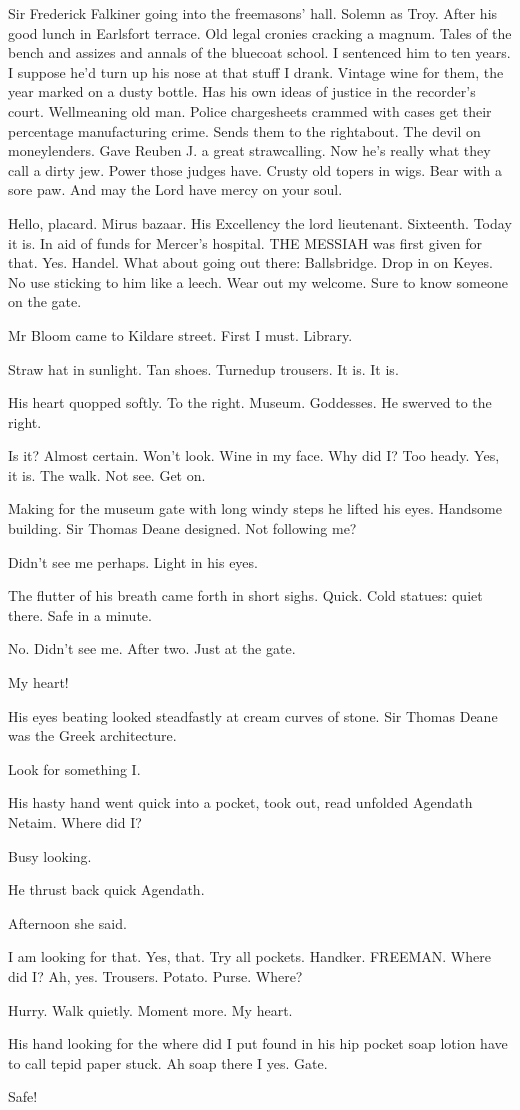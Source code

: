 Sir Frederick Falkiner going into the freemasons' hall. Solemn as Troy.
After his good lunch in Earlsfort terrace. Old legal cronies cracking a
magnum. Tales of the bench and assizes and annals of the bluecoat school.
I sentenced him to ten years. I suppose he'd turn up his nose at that
stuff I drank. Vintage wine for them, the year marked on a dusty bottle.
Has his own ideas of justice in the recorder's court. Wellmeaning old
man. Police chargesheets crammed with cases get their percentage
manufacturing crime. Sends them to the rightabout. The devil on
moneylenders. Gave Reuben J. a great strawcalling. Now he's really what
they call a dirty jew. Power those judges have. Crusty old topers in
wigs. Bear with a sore paw. And may the Lord have mercy on your soul.

Hello, placard. Mirus bazaar. His Excellency the lord lieutenant.
Sixteenth. Today it is. In aid of funds for Mercer's hospital. THE
MESSIAH was first given for that. Yes. Handel. What about going out
there: Ballsbridge. Drop in on Keyes. No use sticking to him like a
leech. Wear out my welcome. Sure to know someone on the gate.

Mr Bloom came to Kildare street. First I must. Library.

Straw hat in sunlight. Tan shoes. Turnedup trousers. It is. It is.

His heart quopped softly. To the right. Museum. Goddesses. He swerved to
the right.

Is it? Almost certain. Won't look. Wine in my face. Why did I? Too heady.
Yes, it is. The walk. Not see. Get on.

Making for the museum gate with long windy steps he lifted his eyes.
Handsome building. Sir Thomas Deane designed. Not following me?

Didn't see me perhaps. Light in his eyes.

The flutter of his breath came forth in short sighs. Quick. Cold statues:
quiet there. Safe in a minute.

No. Didn't see me. After two. Just at the gate.

My heart!

His eyes beating looked steadfastly at cream curves of stone. Sir Thomas
Deane was the Greek architecture.

Look for something I.

His hasty hand went quick into a pocket, took out, read unfolded Agendath
Netaim. Where did I?

Busy looking.

He thrust back quick Agendath.

Afternoon she said.

I am looking for that. Yes, that. Try all pockets. Handker. FREEMAN.
Where did I? Ah, yes. Trousers. Potato. Purse. Where?

Hurry. Walk quietly. Moment more. My heart.

His hand looking for the where did I put found in his hip pocket soap
lotion have to call tepid paper stuck. Ah soap there I yes. Gate.

Safe!


